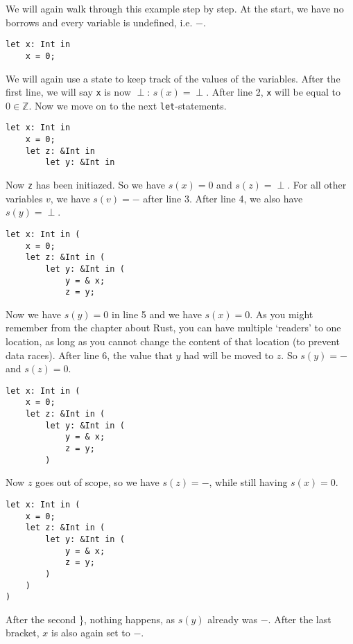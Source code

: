We will again walk through this example step by step. At the start, we have no borrows and every variable is undefined, i.e. $-$.

\begin{verbatim}
let x: Int in 
    x = 0;
\end{verbatim}

We will again use a state to keep track of the values of the variables. After the first line, we will say \texttt{x} is now $\perp$: $s(x) = \perp$.  
After line 2, \verb|x| will be equal to $0 \in \mathbb{Z}$. Now we move on to the next \verb|let|-statements.

\begin{verbatim}
let x: Int in 
    x = 0;
    let z: &Int in 
        let y: &Int in
\end{verbatim}

Now \verb|z| has been initiazed. So we have $s(x) = 0$ and $s(z) = \perp$. For all other variables $v$, we have $s(v) = -$ after line 3. After line 4, we also have $s(y) = \perp$.

\begin{verbatim}
let x: Int in (
    x = 0;
    let z: &Int in (
        let y: &Int in (
            y = & x;
            z = y;
\end{verbatim}

Now we have $s(y) = 0$ in line 5 and we have $s(x) = 0$. As you might remember from the chapter about Rust, you can have multiple `readers' to one location, as long as you cannot change the content of that location (to prevent data races). After line 6, the value that $y$ had will be moved to $z$. So $s(y) = -$ and $s(z) = 0$.

\begin{verbatim}
let x: Int in (
    x = 0;
    let z: &Int in (
        let y: &Int in (
            y = & x;
            z = y;
        )
\end{verbatim}

Now $z$ goes out of scope, so we have $s(z) = -$, while still having $s(x) = 0$. 

\begin{verbatim}
let x: Int in (
    x = 0;
    let z: &Int in (
        let y: &Int in (
            y = & x;
            z = y;
        )
    ) 
)
\end{verbatim} 

After the second \}, nothing happens, as $s(y)$ already was $-$. After the last bracket, $x$ is also again set to $-$. 


